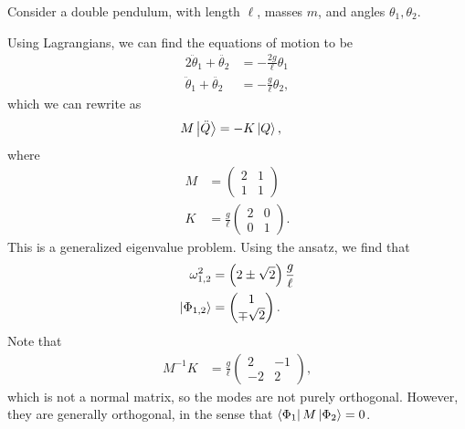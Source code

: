 \documentclass[10pt]{mypackage}
\begin{document}
\begin{example}
  Consider a double pendulum, with length $\ell$, masses $m$, and angles $\theta_1,\theta_2$.\newline

  Using Lagrangians, we can find the equations of motion to be
  \begin{align*}
    2\ddot{\theta}_1 + \ddot{\theta_2} &= -\frac{2g}{\ell}\theta_1\\
    \ddot{\theta}_1 + \ddot{\theta_2} &= -\frac{g}{\ell}\theta_2,
  \end{align*}
  which we can rewrite as
  \begin{align*}
    M\ket{\ddot{Q}} &= -K\ket{Q},
  \end{align*}
  where
  \begin{align*}
    M &= \begin{pmatrix}2 & 1 \\ 1 & 1\end{pmatrix}\\
    K &= \frac{g}{\ell} \begin{pmatrix}2 & 0 \\ 0 & 1\end{pmatrix}.
  \end{align*}
  This is a generalized eigenvalue problem. Using the ansatz, we find that
  \begin{align*}
    \omega_{1,2}^2 &= \left(2 \pm \sqrt{2}\right) \frac{g}{\ell}\\
    \ket{\Phi_{1,2}} &= \begin{pmatrix}1\\ \mp\sqrt{2}\end{pmatrix}.
  \end{align*}
  Note that
  \begin{align*}
    M^{-1}K &= \frac{g}{\ell} \begin{pmatrix}2 & -1 \\ -2 & 2\end{pmatrix},
  \end{align*}
  which is not a normal matrix, so the modes are not purely orthogonal. However, they are generally orthogonal, in the sense that $\bra{\Phi_1}M\ket{\Phi_2} = 0$.
\end{example}
\end{document}
